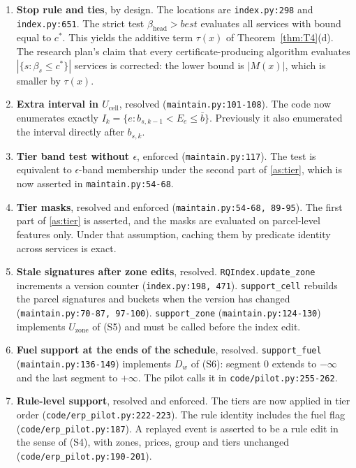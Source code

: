\documentclass[11pt]{article}
\theoremstyle{definition}
\theoremstyle{remark}
\newcommand{\code}[1]{\texttt{#1}}
\begin{document}
\begingroup\raggedright
\begin{enumerate}[label=M\arabic*,leftmargin=*]
\item \textbf{Stop rule and ties}, by design. The locations are \code{index.py:298} and
\code{index.py:651}. The strict test $\beta_{\mathrm{head}}>\mathit{best}$ evaluates all services
with bound equal to $c^*$. This yields the additive term $\tau(x)$ of
Theorem~\ref{thm:T4}(d). The research plan's claim that every certificate-producing
algorithm evaluates $|\{s:\beta_s\le c^*\}|$ services is corrected: the lower bound is
$|M(x)|$, which is smaller by $\tau(x)$.
\item \textbf{Extra interval in $U_{\mathrm{cell}}$}, resolved (\code{maintain.py:101-108}). The
code now enumerates exactly $I_k=\{e:b_{s,k-1}<E_e\le\bar b\}$. Previously it also
enumerated the interval directly after $b_{s,k}$.
\item \textbf{Tier band test without $\epsilon$}, enforced (\code{maintain.py:117}). The test
is equivalent to $\epsilon$-band membership under the second part of \ref{as:tier}, which
is now asserted in \code{maintain.py:54-68}.
\item \textbf{Tier masks}, resolved and enforced (\code{maintain.py:54-68, 89-95}). The first
part of \ref{as:tier} is asserted, and the masks are evaluated on parcel-level features
only. Under that assumption, caching them by predicate identity across services is
exact.
\item \textbf{Stale signatures after zone edits}, resolved. \code{RQIndex.update\_zone}
increments a version counter (\code{index.py:198, 471}). \code{support\_cell} rebuilds the
parcel signatures and buckets when the version has changed
(\code{maintain.py:70-87, 97-100}). \code{support\_zone} (\code{maintain.py:124-130}) implements
$U_{\mathrm{zone}}$ of (S5) and must be called before the index edit.
\item \textbf{Fuel support at the ends of the schedule}, resolved. \code{support\_fuel}
(\code{maintain.py:136-149}) implements $D_w$ of (S6): segment $0$ extends to $-\infty$ and
the last segment to $+\infty$. The pilot calls it in \code{code/pilot.py:255-262}.
\item \textbf{Rule-level support}, resolved and enforced. The tiers are now applied in
tier order (\code{code/erp\_pilot.py:222-223}). The rule identity includes the fuel flag
(\code{code/erp\_pilot.py:187}). A replayed event is asserted to be a rule edit in the sense
of (S4), with zones, prices, group and tiers unchanged (\code{code/erp\_pilot.py:190-201}).

\end{enumerate}
\end{document}
